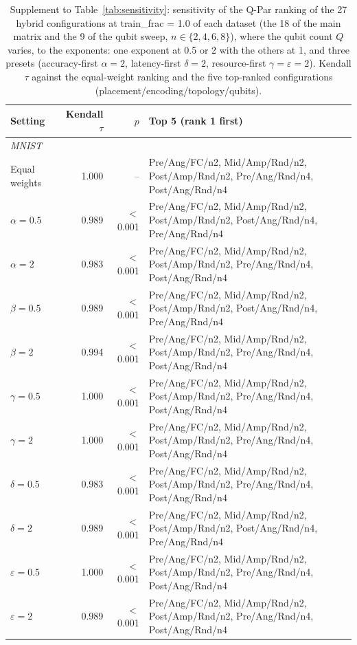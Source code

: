 \begin{table}[!t]
\centering
\caption{Supplement to Table~\ref{tab:sensitivity}: sensitivity of the Q-Par ranking of the 27 hybrid configurations at train\_frac = 1.0 of each dataset (the 18 of the main matrix and the 9 of the qubit sweep, $n \in \{2, 4, 6, 8\}$), where the qubit count $Q$ varies, to the exponents: one exponent at 0.5 or 2 with the others at 1, and three presets (accuracy-first $\alpha = 2$, latency-first $\delta = 2$, resource-first $\gamma = \varepsilon = 2$). Kendall $\tau$ against the equal-weight ranking and the five top-ranked configurations (placement/encoding/topology/qubits).}
\label{tab:sensitivity_supplement}
\scriptsize
\begin{tabular}{lrrl}
\toprule
Setting & Kendall $\tau$ & $p$ & Top 5 (rank 1 first) \\
\midrule
\multicolumn{4}{l}{\textit{MNIST}} \\
Equal weights & 1.000 & -- & Pre/Ang/FC/n2, Mid/Amp/Rnd/n2, Post/Amp/Rnd/n2, Pre/Ang/Rnd/n4, Post/Ang/Rnd/n4 \\
$\alpha = 0.5$ & 0.989 & $<$0.001 & Pre/Ang/FC/n2, Mid/Amp/Rnd/n2, Post/Amp/Rnd/n2, Post/Ang/Rnd/n4, Pre/Ang/Rnd/n4 \\
$\alpha = 2$ & 0.983 & $<$0.001 & Pre/Ang/FC/n2, Mid/Amp/Rnd/n2, Post/Amp/Rnd/n2, Pre/Ang/Rnd/n4, Post/Ang/Rnd/n4 \\
$\beta = 0.5$ & 0.989 & $<$0.001 & Pre/Ang/FC/n2, Mid/Amp/Rnd/n2, Post/Amp/Rnd/n2, Post/Ang/Rnd/n4, Pre/Ang/Rnd/n4 \\
$\beta = 2$ & 0.994 & $<$0.001 & Pre/Ang/FC/n2, Mid/Amp/Rnd/n2, Post/Amp/Rnd/n2, Pre/Ang/Rnd/n4, Post/Ang/Rnd/n4 \\
$\gamma = 0.5$ & 1.000 & $<$0.001 & Pre/Ang/FC/n2, Mid/Amp/Rnd/n2, Post/Amp/Rnd/n2, Pre/Ang/Rnd/n4, Post/Ang/Rnd/n4 \\
$\gamma = 2$ & 1.000 & $<$0.001 & Pre/Ang/FC/n2, Mid/Amp/Rnd/n2, Post/Amp/Rnd/n2, Pre/Ang/Rnd/n4, Post/Ang/Rnd/n4 \\
$\delta = 0.5$ & 0.983 & $<$0.001 & Pre/Ang/FC/n2, Mid/Amp/Rnd/n2, Post/Amp/Rnd/n2, Pre/Ang/Rnd/n4, Post/Ang/Rnd/n4 \\
$\delta = 2$ & 0.989 & $<$0.001 & Pre/Ang/FC/n2, Mid/Amp/Rnd/n2, Post/Amp/Rnd/n2, Post/Ang/Rnd/n4, Pre/Ang/Rnd/n4 \\
$\varepsilon = 0.5$ & 1.000 & $<$0.001 & Pre/Ang/FC/n2, Mid/Amp/Rnd/n2, Post/Amp/Rnd/n2, Pre/Ang/Rnd/n4, Post/Ang/Rnd/n4 \\
$\varepsilon = 2$ & 0.989 & $<$0.001 & Pre/Ang/FC/n2, Mid/Amp/Rnd/n2, Post/Amp/Rnd/n2, Pre/Ang/Rnd/n4, Post/Ang/Rnd/n4 \\

\end{tabular}
\end{table}
